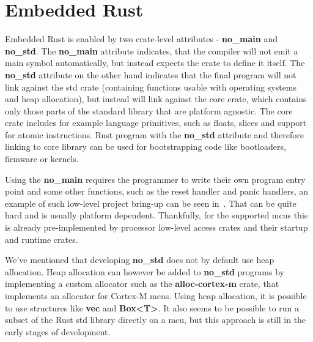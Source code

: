 \section{Embedded Rust}
\label{sec:embedded_rust}
Embedded Rust is enabled by two crate-level attributes - \textbf{no\_main} and \textbf{no\_std}.
The \textbf{no\_main} attribute indicates, that the compiler will not emit a main symbol automatically, but instead expects the crate to define it itself\cite{noauthor_crates_2021}.
The \textbf{no\_std} attribute on the other hand indicates that the final program will not link against the std crate (containing functions usable with operating systems and heap allocation), but instead will link against the core crate, which contains only those parts of the standard library that are platform agnostic.
The core crate includes for example language primitives, such as floats, slices and support for atomic instructions.
Rust program with the \textbf{no\_std} attribute and therefore linking to core library can be used for bootstrapping code like bootloaders, firmware or kernels\cite{rust_embedded_wg_introduction_2021}.

Using the \textbf{no\_main} requires the programmer to write their own program entry point and some other functions, such as the reset handler and panic handlers, an example of such low-level project bring-up can be seen in~\cite{munns_zero_2019}.
That can be quite hard and is usually platform dependent.
Thankfully, for the supported \acs{mcu}s this is already pre-implemented by processor low-level access crates and their startup and runtime crates.

We've mentioned that developing \textbf{no\_std} does not by default use heap allocation.
Heap allocation can however be added to \textbf{no\_std} programs by implementing a custom allocator such as the \textbf{alloc-cortex-m} crate\cite{noauthor_rust-embeddedalloc-cortex-m_2021}, that implements an allocator for Cortex-M \acs{mcu}s.
Using heap allocation, it is possible to use structures like \textbf{vec} and \textbf{Box<T>}\cite{noauthor_alloc_nodate}.
It also seems to be possible to run a subset of the Rust std library directly on a \acs{mcu}\cite{hutt_using_nodate}, but this approach is still in the early stages of development.

